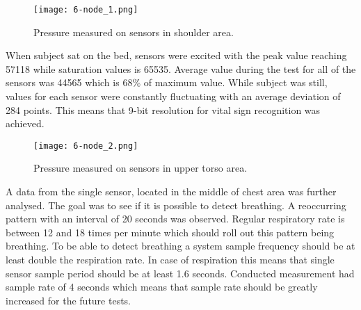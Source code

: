 \begin{figure}[h]
  \begin{center}
    \texttt{[image: 6-node\_1.png]}
  \end{center}
  \caption{Pressure measured on sensors in shoulder area.}
  \label{fig:node_1}
\end{figure}

When subject sat on the bed, sensors were excited with the peak value reaching 57118 while saturation values is 65535. Average value during the test for all of the sensors was 44565 which is 68\% of maximum value. While subject was still, values for each sensor were constantly fluctuating with an average deviation of 284 points. This means that 9-bit resolution for vital sign recognition was achieved. 

\begin{figure}[h]
  \begin{center}
    \texttt{[image: 6-node\_2.png]}
  \end{center}
  \caption{Pressure measured on sensors in upper torso area.}
  \label{fig:node_2}
\end{figure}

A data from the single sensor, located in the middle of chest area was further analysed. The goal was to see if it is possible to detect breathing. A reoccurring pattern with an interval of 20 seconds was observed. Regular respiratory rate is between 12 and 18 times per minute which should roll out this pattern being breathing. To be able to detect breathing a system sample frequency should be at least double the respiration rate. In case of respiration this means that single sensor sample period should be at least 1.6 seconds. Conducted measurement had sample rate of 4 seconds which means that sample rate should be greatly increased for the future tests.